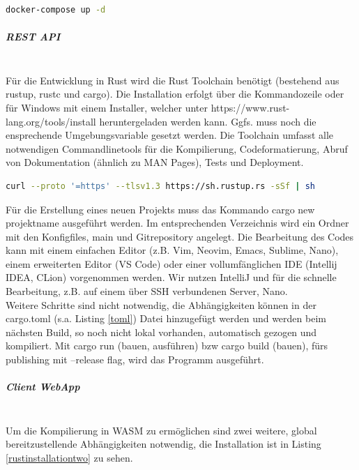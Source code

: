 \documentclass[notitlepage, hidelinks]{article}
\begin{document}
\begin{lstlisting}[language=bash,frame=single,caption=CLI Command zum Ausführen der docker-compose Datei. Das Kommando muss im Verzeichnis ausgeführt werden\, in dem die Datei liegt\, oder der Pfad der Datei über die flag --f spezifiziert werden,label=surrealdockerthree]
docker-compose up -d
\end{lstlisting}
\newpage
\subparagraph{REST API} \mbox{} \\
Für die Entwicklung in Rust wird die Rust Toolchain benötigt (bestehend aus rustup, rustc und cargo). Die Installation erfolgt über die Kommandozeile oder für Windows mit einem Installer, welcher unter https://www.rust-lang.org/tools/install heruntergeladen werden kann. Ggfs. muss noch die ensprechende Umgebungsvariable gesetzt werden. Die Toolchain umfasst alle notwendigen Commandlinetools für die Kompilierung, Codeformatierung, Abruf von Dokumentation (ähnlich zu MAN Pages), Tests und Deployment. 

\begin{lstlisting}[language=bash,frame=single,caption=CLI Command zur Installation von Rust in Linux und macOS,label=rustinstallationone]
curl --proto '=https' --tlsv1.3 https://sh.rustup.rs -sSf | sh
\end{lstlisting}

Für die Erstellung eines neuen Projekts muss das Kommando cargo new projektname ausgeführt werden. Im entsprechenden Verzeichnis wird ein Ordner mit den Konfigfiles, main und Gitrepository angelegt. Die Bearbeitung des Codes kann mit einem einfachen Editor (z.B. Vim, Neovim, Emacs, Sublime, Nano), einem erweiterten Editor (VS Code) oder einer vollumfänglichen IDE (Intellij IDEA, CLion) vorgenommen werden. Wir nutzen IntelliJ und für die schnelle Bearbeitung, z.B. auf einem über SSH verbundenen Server, Nano. \\
Weitere Schritte sind nicht notwendig, die Abhängigkeiten können in der cargo.toml (s.a. Listing \ref{toml}) Datei hinzugefügt werden und werden beim nächsten Build, so noch nicht lokal vorhanden, automatisch gezogen und kompiliert. Mit cargo run (bauen, ausführen) bzw cargo build (bauen), fürs publishing mit --release flag, wird das Programm ausgeführt. 

\subparagraph{Client WebApp} \mbox{} \\
Um die Kompilierung in WASM zu ermöglichen sind zwei weitere, global bereitzustellende Abhängigkeiten notwendig, die Installation ist in Listing \ref{rustinstallationtwo} zu sehen.
\end{document}
